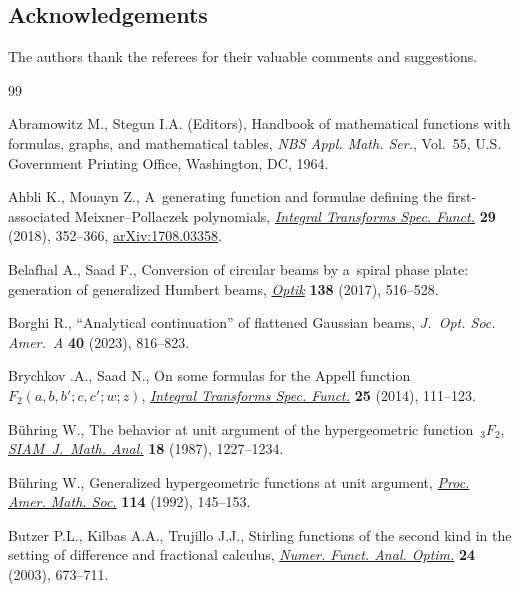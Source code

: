 \documentclass[10pt,a4paper]{amsart}
\numberwithin{equation}{section}
\begin{document}
\subsection*{Acknowledgements} The authors thank the referees for their valuable comments and suggestions.


\begin{thebibliography}{99}
\footnotesize\itemsep=0pt

Abramowitz M., Stegun I.A. (Editors), Handbook of mathematical functions with
 formulas, graphs, and mathematical tables, \textit{NBS Appl. Math. Ser.},
 Vol.~55, U.S. Government Printing Office, Washington, DC, 1964.

Ahbli K., Mouayn Z., A~generating function and formulae defining the
 first-associated {M}eixner--{P}ollaczek polynomials, \href{https://doi.org/10.1080/10652469.2018.1435647}{\textit{Integral
 Transforms Spec. Funct.}} \textbf{29} (2018), 352--366, \href{https://arxiv.org/abs/1708.03358}{arXiv:1708.03358}.

Belafhal A., Saad F., Conversion of circular beams by a~spiral phase plate:
 generation of generalized {H}umbert beams, \href{https://doi.org/10.1016/j.ijleo.2017.03.097}{\textit{Optik}} \textbf{138}
 (2017), 516--528.

Borghi R., ``Analytical continuation'' of flattened {G}aussian beams,
 \textit{J.~Opt. Soc. Amer.~A} \textbf{40} (2023), 816--823.

Brychkov {}.A., Saad N., On some formulas for the {A}ppell function
 {$F_2(a,b,b';c,c';w;z)$}, \href{https://doi.org/10.1080/10652469.2013.822207}{\textit{Integral Transforms Spec. Funct.}}
 \textbf{25} (2014), 111--123.

B\"uhring W., The behavior at unit argument of the hypergeometric
 function~{$_3F_2$}, \href{https://doi.org/10.1137/0518089}{\textit{SIAM~J.~Math. Anal.}} \textbf{18} (1987),
 1227--1234.

B\"uhring W., Generalized hypergeometric functions at unit argument,
 \href{https://doi.org/10.2307/2159793}{\textit{Proc. Amer. Math. Soc.}} \textbf{114} (1992), 145--153.

Butzer P.L., Kilbas A.A., Trujillo J.J., Stirling functions of the second kind
 in the setting of difference and fractional calculus, \href{https://doi.org/10.1081/NFA-120026366}{\textit{Numer. Funct.
 Anal. Optim.}} \textbf{24} (2003), 673--711.


\end{thebibliography}
\end{document}
